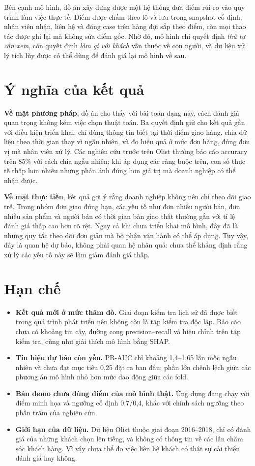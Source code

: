 \documentclass[12pt,a4paper]{report}
\begin{document}
Bên cạnh mô hình, đồ án xây dựng được một hệ thống đưa điểm rủi ro vào quy trình làm việc thực tế. Điểm được chấm theo lô và lưu trong snapshot cố định; nhân viên nhận, liên hệ và đóng case trên hàng đợi sắp theo điểm, còn mọi thao tác được ghi lại mà không sửa điểm gốc. Nhờ đó, mô hình chỉ quyết định \emph{thứ tự cần xem}, còn quyết định \emph{làm gì với khách} vẫn thuộc về con người, và dữ liệu xử lý tích lũy được có thể dùng để đánh giá lại mô hình về sau.

\section{Ý nghĩa của kết quả}

\textbf{Về mặt phương pháp}, đồ án cho thấy với bài toán dạng này, cách đánh giá quan trọng không kém việc chọn thuật toán. Ba quyết định giữ cho kết quả gần với điều kiện triển khai: chỉ dùng thông tin biết tại thời điểm giao hàng, chia dữ liệu theo thời gian thay vì ngẫu nhiên, và đo hiệu quả ở mức đơn hàng, đúng đơn vị mà nhân viên xử lý. Các nghiên cứu trước trên Olist thường báo cáo accuracy trên 85\% với cách chia ngẫu nhiên; khi áp dụng các ràng buộc trên, con số thực tế thấp hơn nhiều nhưng phản ánh đúng hơn giá trị mà doanh nghiệp có thể nhận được.

\textbf{Về mặt thực tiễn}, kết quả gợi ý rằng doanh nghiệp không nên chỉ theo dõi giao trễ. Trong nhóm đơn giao đúng hạn, các yếu tố như đơn nhiều người bán, đơn nhiều sản phẩm và người bán có thời gian bàn giao thất thường gắn với tỉ lệ đánh giá thấp cao hơn rõ rệt. Ngay cả khi chưa triển khai mô hình, đây đã là những quy tắc theo dõi đơn giản mà bộ phận vận hành có thể áp dụng. Tuy vậy, đây là quan hệ dự báo, không phải quan hệ nhân quả: chưa thể khẳng định rằng xử lý các yếu tố này sẽ làm giảm đánh giá thấp.

\section{Hạn chế}\label{sec:limitations}

\begin{itemize}
  \item \textbf{Kết quả mới ở mức thăm dò.} Giai đoạn kiểm tra lịch sử đã được biết trong quá trình phát triển nên không còn là tập kiểm tra độc lập. Báo cáo chưa có khoảng tin cậy, đường cong precision--recall và hiệu chỉnh trên tập kiểm tra, cũng như giải thích mô hình bằng SHAP.
  \item \textbf{Tín hiệu dự báo còn yếu.} PR-AUC chỉ khoảng 1,4--1,65 lần mốc ngẫu nhiên và chưa đạt mục tiêu 0,25 đặt ra ban đầu; phần lớn chênh lệch giữa các phương án mô hình nhỏ hơn mức dao động giữa các fold.
  \item \textbf{Bản demo chưa dùng điểm của mô hình thật.} Ứng dụng đang chạy với điểm minh họa và ngưỡng cố định 0,7/0,4, khác với chính sách ngưỡng theo phần trăm của nghiên cứu.
  \item \textbf{Giới hạn của dữ liệu.} Dữ liệu Olist thuộc giai đoạn 2016--2018, chỉ có đánh giá của những khách chọn lên tiếng, và không có thông tin về các lần chăm sóc khách hàng. Vì vậy chưa thể đo việc liên hệ khách có thật sự cải thiện đánh giá hay không.
\end{itemize}
\end{document}

